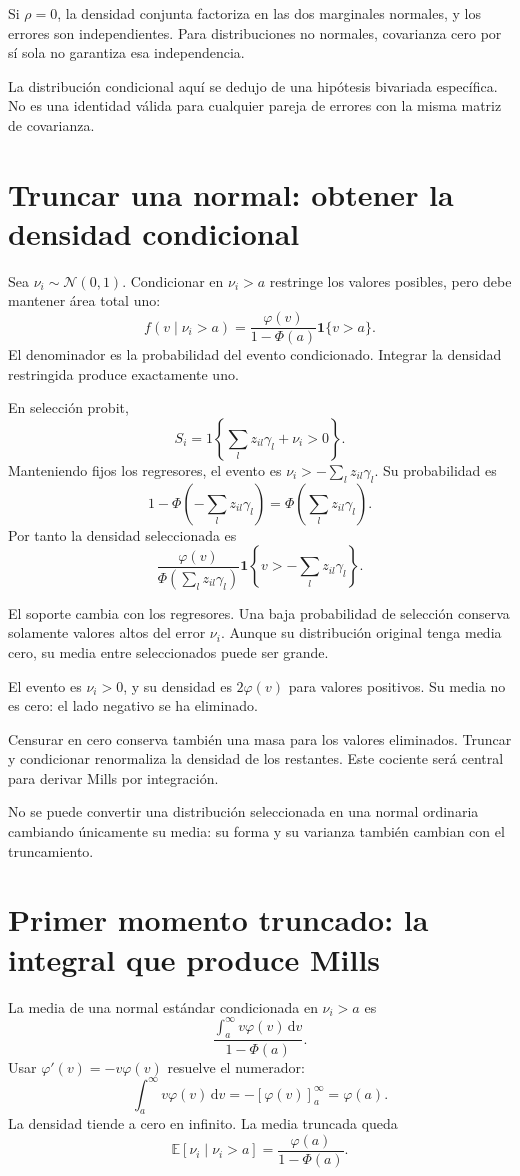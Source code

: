 \documentclass[11pt,a4paper]{article}
\newcommand{\E}{\mathbb E}
\newcommand{\dd}{\,\mathrm d}
\begin{document}
Si \(\rho=0\), la densidad conjunta
factoriza en las dos marginales normales,
y los errores son independientes.
Para distribuciones no normales,
covarianza cero por sí sola
no garantiza esa independencia.

La distribución condicional aquí se
dedujo de una hipótesis bivariada específica.
No es una identidad válida para
cualquier pareja de errores
con la misma matriz de covarianza.

\clearpage
\section{Truncar una normal: obtener la densidad condicional}\label{unidad66}
Sea \(\nu_i\sim\mathcal N(0,1)\).
Condicionar en \(\nu_i>a\) restringe
los valores posibles, pero debe
mantener área total uno:
\[
f(v\mid\nu_i>a)
=\frac{\varphi(v)}{1-\Phi(a)}\mathbf1\{v>a\}.
\]
El denominador es la probabilidad
del evento condicionado.
Integrar la densidad restringida
produce exactamente uno.

En selección probit,
\[
S_i=1\left\{\sum_lz_{il}\gamma_l+\nu_i>0\right\}.
\]
Manteniendo fijos los regresores,
el evento es
\(\nu_i>-\sum_lz_{il}\gamma_l\).
Su probabilidad es
\[
1-\Phi\left(-\sum_lz_{il}\gamma_l\right)
=\Phi\left(\sum_lz_{il}\gamma_l\right).
\]
Por tanto la densidad seleccionada es
\[
\frac{\varphi(v)}
{\Phi(\sum_lz_{il}\gamma_l)}
\mathbf1\left\{v>-\sum_lz_{il}\gamma_l\right\}.
\]

El soporte cambia con los regresores.
Una baja probabilidad de selección
conserva solamente valores altos
del error \(\nu_i\).
Aunque su distribución original
tenga media cero, su media
entre seleccionados puede ser grande.

\begin{ejemplo}
El evento es \(\nu_i>0\),
y su densidad es \(2\varphi(v)\)
para valores positivos.
Su media no es cero:
el lado negativo se ha eliminado.
\end{ejemplo}
Censurar en cero conserva también
una masa para los valores eliminados.
Truncar y condicionar renormaliza
la densidad de los restantes.
Este cociente será central para
derivar Mills por integración.

No se puede convertir una distribución
seleccionada en una normal ordinaria
cambiando únicamente su media:
su forma y su varianza
también cambian con el truncamiento.

\clearpage
\section{Primer momento truncado: la integral que produce Mills}\label{unidad67}
La media de una normal estándar
condicionada en \(\nu_i>a\) es
\[
\frac{\int_a^\infty v\varphi(v)\dd v}
{1-\Phi(a)}.
\]
Usar \(\varphi'(v)=-v\varphi(v)\)
resuelve el numerador:
\[
\int_a^\infty v\varphi(v)\dd v
=-[\varphi(v)]_a^\infty=\varphi(a).
\]
La densidad tiende a cero en infinito.
La media truncada queda
\[
\E[\nu_i\mid\nu_i>a]
=\frac{\varphi(a)}{1-\Phi(a)}.
\]
\end{document}
